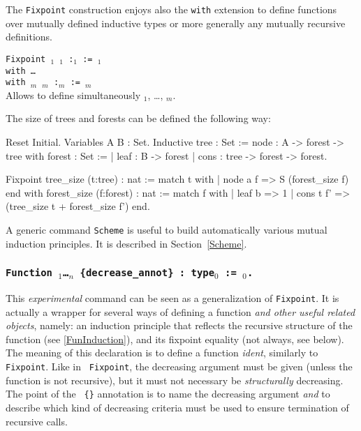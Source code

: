 The {\tt Fixpoint} construction enjoys also the {\tt with} extension
to define functions over mutually defined inductive types or more
generally any mutually recursive definitions.

\begin{Variants}
\item {\tt Fixpoint {\ident$_1$} {\params$_1$} :{\type$_1$} := {\term$_1$}\\
        with {\ldots} \\
        with {\ident$_m$} {\params$_m$} :{\type$_m$} :=  {\type$_m$}}\\
        Allows to define simultaneously {\ident$_1$}, {\ldots},
        {\ident$_m$}.
\end{Variants}

\Example 
The size of trees and forests can be defined the following way: 
\begin{coq_eval}
Reset Initial.
Variables A B : Set.
Inductive tree : Set :=
    node : A -> forest -> tree
with forest : Set :=
  | leaf : B -> forest
  | cons : tree -> forest -> forest.
\end{coq_eval}
\begin{coq_example*}
Fixpoint tree_size (t:tree) : nat :=
  match t with
  | node a f => S (forest_size f)
  end
 with forest_size (f:forest) : nat :=
  match f with
  | leaf b => 1
  | cons t f' => (tree_size t + forest_size f')
  end.
\end{coq_example*}
A generic command {\tt Scheme} is useful to build automatically various
mutual induction principles. It is described in Section~\ref{Scheme}.

\subsubsection{\tt Function {\ident} {\binder$_1$}\ldots{\binder$_n$}
 {\tt \{}decrease\_annot{\tt\}} : type$_0$ := \term$_0$.
\label{Function}}

This \emph{experimental} command can be seen as a generalization of
{\tt Fixpoint}.  It is actually a wrapper for several ways of defining
a function \emph{and other useful related objects}, namely: an
induction principle that reflects the recursive structure of the
function (see \ref{FunInduction}), and its fixpoint equality (not
always, see below).  The meaning of this declaration is to define a
function {\it ident}, similarly to {\tt Fixpoint}. Like in {\tt
Fixpoint}, the decreasing argument must be given (unless the function
is not recursive), but it must not necessary be \emph{structurally}
decreasing. The point of the {\tt
\{\}} annotation is to name the decreasing argument \emph{and} to
describe which kind of decreasing criteria must be used to ensure
termination of recursive calls.

